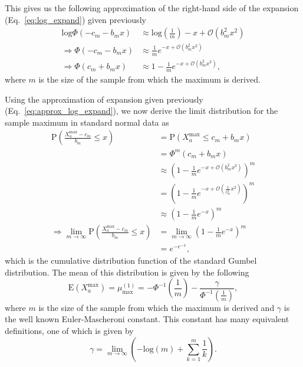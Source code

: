 \documentclass[10pt,letterpaper]{article}
\begin{document}
This gives us the following approximation of the right-hand side of the expansion (Eq.~\ref{eq:log_expand}) given previously
%
\begin{equation}\label{eq:approx_log_expand}
\begin{aligned}
\text{log}\Phi(-c_m - b_m x) &\approx \text{log}\left(\frac{1}{m}\right) - x + \mathcal{O}(b^2_m x^2) \\
\Rightarrow \Phi(-c_m - b_m x) &\approx \frac{1}{m}e^{-x + \mathcal{O}(b^2_m x^2)} \\
\Rightarrow \Phi(c_m + b_m x) &\approx 1 - \frac{1}{m}e^{-x + \mathcal{O}(b^2_m x^2)},
\end{aligned}
\end{equation}
%
where $m$ is the size of the sample from which the maximum is derived.

Using the approximation of expansion given previously (Eq.~\ref{eq:approx_log_expand}), we now derive the limit distribution for the sample maximum in standard normal data as
%
\begin{equation}\label{eq:prob_normal_max}
\begin{aligned}
\text{P}\left(\frac{X^\text{max}_a - c_m}{b_m} \leq x\right) &= \text{P}(X^\text{max}_a \leq c_m + b_m x) \\
&= \Phi^m(c_m + b_m x) \\
&\approx \left(1 - \frac{1}{m}e^{-x + \mathcal{O}(b^2_m x^2)}\right)^m \\
&= \left(1 - \frac{1}{m}e^{-x + \mathcal{O}\left(\frac{1}{c^2_m} x^2\right)}\right)^m \\
&\approx \left(1 - \frac{1}{m}e^{-x}\right)^m \\
\Rightarrow \lim_{m \to \infty} \text{P}\left(\frac{X^\text{max}_a - c_m}{b_m} \leq x\right) &= \lim_{m \to \infty} \left(1 - \frac{1}{m}e^{-x}\right)^m \\
&= e^{-e^{-x}},
\end{aligned}
\end{equation}
%
which is the cumulative distribution function of the standard Gumbel distribution. The mean of this distribution is given by the following
%
\begin{equation}\label{eq:mu_max_normal}
\text{E}(X^\text{max}_a) = \mu^{(1)}_\text{max} = -\Phi^{-1} \left(\frac{1}{m}\right) - \frac{\gamma}{\Phi^{-1}\left(\frac{1}{m}\right)},
\end{equation}
%
where $m$ is the size of the sample from which the maximum is derived and $\gamma$ is the well known Euler-Mascheroni constant. This constant has many equivalent definitions, one of which is given by
%
\[
\gamma = \lim_{m \to \infty} \left(-\text{log}(m) + \sum^{m}_{k=1}\frac{1}{k}\right).
\]
\end{document}
